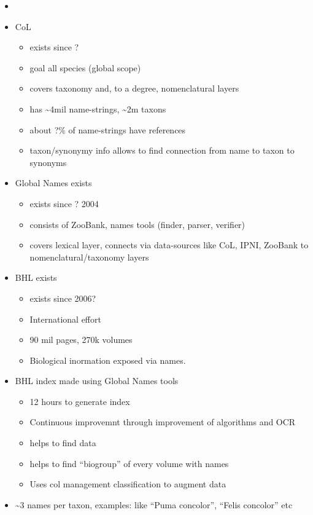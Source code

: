 \documentclass[
]{article}
\providecommand{\tightlist}{%
  \setlength{\itemsep}{0pt}\setlength{\parskip}{0pt}}
\begin{document}
\begin{itemize}
\item
\item
  CoL

  \begin{itemize}
  \tightlist
  \item
    exists since ?
  \item
    goal all species (global scope)
  \item
    covers taxonomy and, to a degree, nomenclatural layers
  \item
    has \textasciitilde4mil name-strings, \textasciitilde2m taxons
  \item
    about ?\% of name-strings have references
  \item
    taxon/synonymy info allows to find connection from name to taxon to
    synonyms
  \end{itemize}
\item
  Global Names exists

  \begin{itemize}
  \tightlist
  \item
    exists since ? 2004
  \item
    consists of ZooBank, names tools (finder, parser, verifier)
  \item
    covers lexical layer, connects via data-sources like CoL, IPNI,
    ZooBank to nomenclatural/taxonomy layers
  \end{itemize}
\item
  BHL exists

  \begin{itemize}
  \tightlist
  \item
    exists since 2006?
  \item
    International effort
  \item
    90 mil pages, 270k volumes
  \item
    Biological inormation exposed via names.
  \end{itemize}
\item
  BHL index made using Global Names tools

  \begin{itemize}
  \tightlist
  \item
    12 hours to generate index
  \item
    Continuous improvemnt through improvement of algorithms and OCR
  \item
    helps to find data
  \item
    helps to find ``biogroup'' of every volume with names
  \item
    Uses col management classification to augment data
  \end{itemize}
\item
  \textasciitilde3 names per taxon, examples: like ``Puma concolor'',
  ``Felis concolor'' etc


\end{itemize}
\end{document}
